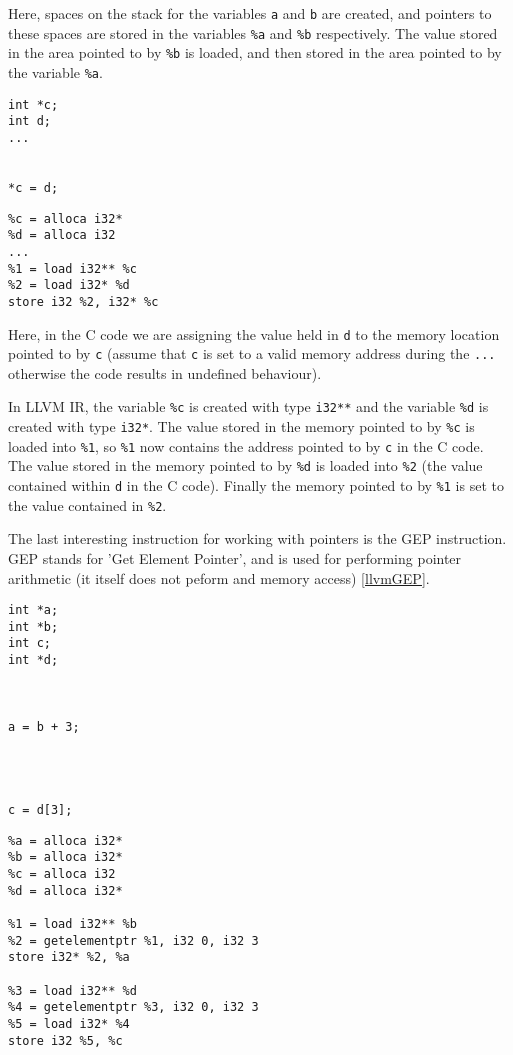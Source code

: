 Here, spaces on the stack for the variables \verb!a! and \verb!b! are created, and pointers to these spaces are stored in the variables \verb!%a! and \verb!%b! respectively.
The value stored in the area pointed to by \verb!%b! is loaded, and then stored in the area pointed to by the variable \verb!%a!.

\begin{minipage}[t]{0.5\linewidth}
\begin{verbatim}
int *c;
int d;
...


*c = d;
\end{verbatim}
\end{minipage}
\begin{minipage}[t]{0.5\linewidth}
\begin{verbatim}
%c = alloca i32*
%d = alloca i32
...
%1 = load i32** %c
%2 = load i32* %d
store i32 %2, i32* %c
\end{verbatim}
\end{minipage}

Here, in the C code we are assigning the value held in \verb!d! to the memory location pointed to by \verb!c! (assume that \verb!c! is set to a valid memory address during the \verb!...! otherwise the code results in undefined behaviour).

In LLVM IR, the variable \verb!%c! is created with type \verb!i32**! and the variable \verb!%d! is created with type \verb!i32*!.
The value stored in the memory pointed to by \verb!%c! is loaded into \verb!%1!, so \verb!%1! now contains the address pointed to by \verb!c! in the C code.
The value stored in the memory pointed to by \verb!%d! is loaded into \verb!%2! (the value contained within \verb!d! in the C code).
Finally the memory pointed to by \verb!%1! is set to the value contained in \verb!%2!.

The last interesting instruction for working with pointers is the GEP instruction.
GEP stands for 'Get Element Pointer', and is used for performing pointer arithmetic (it itself does not peform and memory access) \ref{llvmGEP}.

\begin{minipage}[t]{0.3\linewidth}
\begin{verbatim}
int *a;
int *b;
int c;
int *d;



a = b + 3;




c = d[3];
\end{verbatim}
\end{minipage}
\begin{minipage}[t]{0.7\linewidth}
\begin{verbatim}
%a = alloca i32*
%b = alloca i32*
%c = alloca i32
%d = alloca i32*

%1 = load i32** %b
%2 = getelementptr %1, i32 0, i32 3
store i32* %2, %a

%3 = load i32** %d
%4 = getelementptr %3, i32 0, i32 3
%5 = load i32* %4
store i32 %5, %c
\end{verbatim}
\end{minipage}


